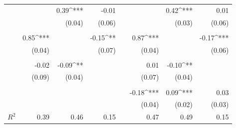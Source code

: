 \begin{table}
\begin{tabularx}{\textwidth}{@{\extracolsep{0pt}}X d d d d d d d }
         &            & 0.39^{***}  & -0.01       & &             & 0.42^{***}  & 0.01 \\
                   &            & (0.04)      & (0.06)      & &             & (0.03)      & (0.06) \\
  \\
         & 0.85^{***} &             & -0.15^{**}  & & 0.87^{***}  &             & -0.17^{***} \\
                   & (0.04)     &             & (0.07)      & & (0.04)      &             & (0.06) \\
  \\
         & -0.02      & -0.09^{**}  &             & & 0.01        & -0.10^{**}  & \\
                   & (0.09)     & (0.04)      &             & & (0.07)      & (0.04)      & \\
  \\
         &            &             &             & & -0.18^{***} & 0.09^{***}  & 0.03 \\
                   &            &             &             & & (0.04)      & (0.02)      & (0.03) \\
\midrule
$R^2$ &
  0.39 &
  0.46 &
  0.15 & &
  0.47 &
  0.49 &
  0.15 \\ 
\bottomrule
\end{tabularx} 
\end{table}
